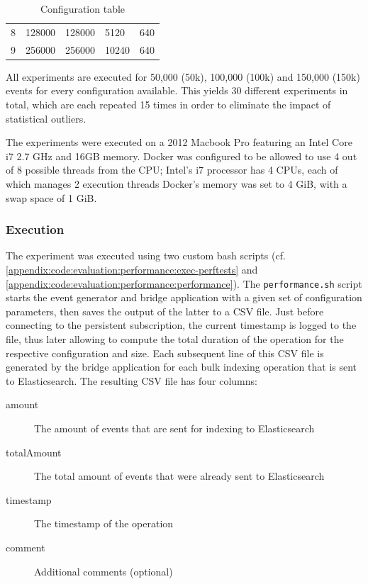\begin{table}
\begin{tabular}{lllll}
8                                           & 128000                                                     & 128000                                                & 5120                                                      & 640                                                              \\
9                                           & 256000                                                     & 256000                                                & 10240                                                     & 640                                                             
\end{tabular}
\caption{Configuration table}
\label{table:configs}
\end{table}

All experiments are executed for 50,000 (50k), 100,000 (100k) and 150,000 (150k) events for every configuration available.
This yields 30 different experiments in total, which are each repeated 15 times in order to eliminate the impact of statistical outliers.

The experiments were executed on a 2012 Macbook Pro featuring an Intel Core i7 2.7 GHz and 16GB memory.
Docker was configured to be allowed to use 4 out of 8 possible threads from the CPU; Intel's i7 processor has 4 CPUs, each of which manages 2 execution threads
Docker's memory was set to 4 GiB, with a swap space of 1 GiB.

\subsubsection{Execution}

The experiment was executed using two custom bash scripts (cf. \cref{appendix:code:evaluation:performance:exec-perftests} and \cref{appendix:code:evaluation:performance:performance}).
The \texttt{performance.sh} script starts the event generator and bridge application with a given set of configuration parameters, then saves the output of the latter to a CSV file.
Just before connecting to the persistent subscription, the current timestamp is logged to the file, thus later allowing to compute the total duration of the operation for the respective configuration and size.
Each subsequent line of this CSV file is generated by the bridge application for each bulk indexing operation that is sent to Elasticsearch.
The resulting CSV file has four columns:

\begin{description}
\item[amount] The amount of events that are sent for indexing to Elasticsearch
\item[totalAmount] The total amount of events that were already sent to Elasticsearch
\item[timestamp] The timestamp of the operation
\item[comment] Additional comments (optional)
\end{description}

